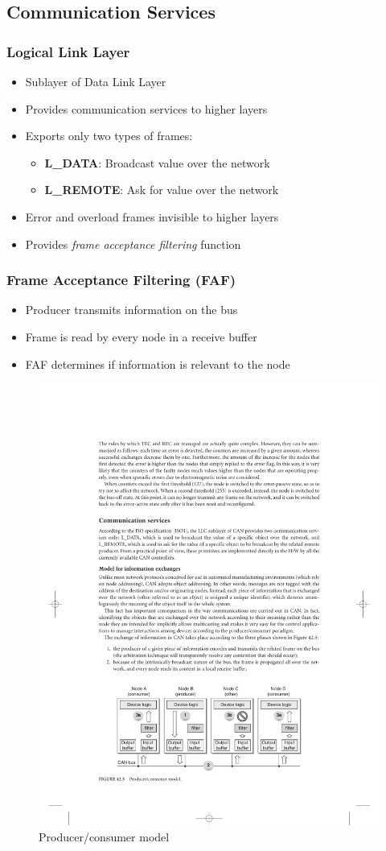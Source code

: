 \documentclass{beamer}
\begin{document}
\subsection{Communication Services}
\begin{frame}
	\frametitle{Logical Link Layer}
	\begin{itemize}
		\item Sublayer of Data Link Layer
		\item Provides communication services to higher layers
		\item Exports only two types of frames:
		\begin{itemize}
			\item \textbf{L\_DATA}: Broadcast value over the network
			\item \textbf{L\_REMOTE}: Ask for value over the network
		\end{itemize}
		\item Error and overload frames invisible to higher layers
		\item Provides \emph{frame acceptance filtering} function
	\end{itemize}
\end{frame}

\begin{frame}
	\frametitle{Frame Acceptance Filtering (FAF)}
	\begin{itemize}
		\item Producer transmits information on the bus
		\item Frame is read by every node in a receive buffer
		\item FAF determines if information is relevant to the node
	\end{itemize}
	
		\begin{figure}
		\includegraphics[width=.5\textwidth]{filtering.pdf} 
		\caption{Producer/consumer model}%
	\end{figure}
\end{frame}
\end{document}
